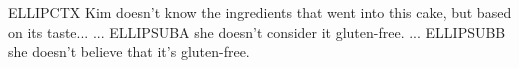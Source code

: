 


\ea ELLIPCTX Kim doesn't know the ingredients that went into this cake, but
    based on its taste...
  \ea ... ELLIPSUBA she doesn't consider it gluten-free.
  \ex ... ELLIPSUBB she doesn't believe that it's gluten-free.
  \z
\z


